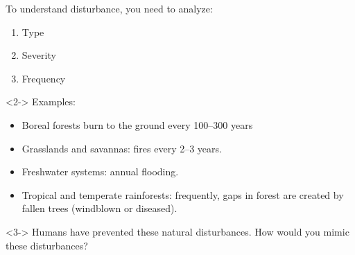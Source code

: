 \begin{frame}[t]
    \begin{adjustwidth}{-2em}{-1.5em}
        To understand disturbance, you need to analyze:
        \begin{enumerate}
            \item Type 
            \item Severity 
            \item Frequency 
        \end{enumerate}

        \begin{uncoverenv}<2->
        Examples:
        \begin{itemize}
            \item Boreal forests burn to the ground every 100--300 years

                \vspace{4mm}
            \item Grasslands and savannas: fires every 2--3 years.

                \vspace{4mm}
            \item Freshwater systems: annual flooding.

                \vspace{4mm}
            \item Tropical and temperate rainforests: frequently, gaps in
                forest are created by fallen trees (windblown or diseased).
        \end{itemize}
        \end{uncoverenv}

        \begin{uncoverenv}<3->
        Humans have prevented these natural disturbances.  How would you mimic
        these disturbances?

        \end{uncoverenv}

    \end{adjustwidth}
\end{frame}

